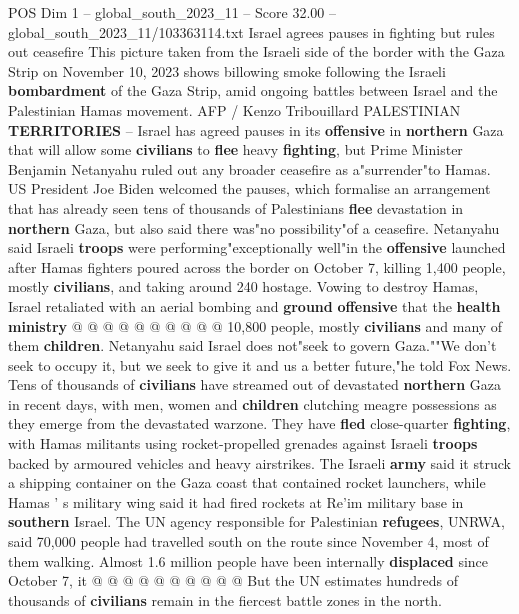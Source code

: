 \begin{textsample}{POS Dim 1 – global\_south\_2023\_11 – Score 32.00 – global\_south\_2023\_11/103363114.txt}  \label{ex:f1_pos_128}
Israel agrees pauses in fighting but rules out ceasefire This picture taken from the Israeli side of the border with the Gaza Strip on November 10, 2023 shows billowing smoke following the Israeli \textbf{bombardment} of the Gaza Strip, amid ongoing battles between Israel and the Palestinian Hamas movement.
AFP / Kenzo Tribouillard PALESTINIAN \textbf{TERRITORIES} -- Israel has agreed pauses in its \textbf{offensive} in \textbf{northern} Gaza that will allow some \textbf{civilians} to \textbf{flee} heavy \textbf{fighting}, but Prime Minister Benjamin Netanyahu ruled out any broader ceasefire as a"surrender"to Hamas.
US President Joe Biden welcomed the pauses, which formalise an arrangement that has already seen tens of thousands of Palestinians \textbf{flee} devastation in \textbf{northern} Gaza, but also said there was"no possibility"of a ceasefire.
Netanyahu said Israeli \textbf{troops} were performing"exceptionally well"in the \textbf{offensive} launched after Hamas fighters poured across the border on October 7, killing 1,400 people, mostly \textbf{civilians}, and taking around 240 hostage.
Vowing to destroy Hamas, Israel retaliated with an aerial bombing and \textbf{ground} \textbf{offensive} that the \textbf{health} \textbf{ministry} @ @ @ @ @ @ @ @ @ @ 10,800 people, mostly \textbf{civilians} and many of them \textbf{children}.
Netanyahu said Israel does not"seek to govern Gaza.""We don't seek to occupy it, but we seek to give it and us a better future,"he told Fox News.
Tens of thousands of \textbf{civilians} have streamed out of devastated \textbf{northern} Gaza in recent days, with men, women and \textbf{children} clutching meagre possessions as they emerge from the devastated warzone.
They have \textbf{fled} close-quarter \textbf{fighting}, with Hamas militants using rocket-propelled grenades against Israeli \textbf{troops} backed by armoured vehicles and heavy airstrikes.
The Israeli \textbf{army} said it struck a shipping container on the Gaza coast that contained rocket launchers, while Hamas ' s military wing said it had fired rockets at Re'im military base in \textbf{southern} Israel.
The UN agency responsible for Palestinian \textbf{refugees}, UNRWA, said 70,000 people had travelled south on the route since November 4, most of them walking.
Almost 1.6 million people have been internally \textbf{displaced} since October 7, it @ @ @ @ @ @ @ @ @ @ But the UN estimates hundreds of thousands of \textbf{civilians} remain in the fiercest battle zones in the north.

\end{textsample}
